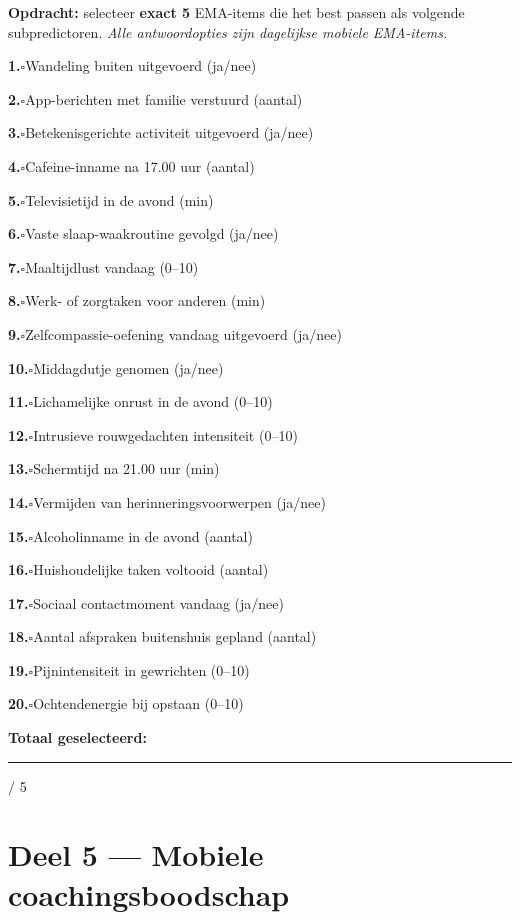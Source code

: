 \documentclass[11pt,a4paper]{article}
\newcommand{\checkitemBFS}[2]{%
\noindent\small\textbf{#1.}\hspace{0.45em}$\square$\hspace{0.4em}#2\par\vspace{0.20em}}
\begin{document}
\begin{responsebox}
\small\textbf{Opdracht:} selecteer \textbf{exact 5} EMA-items die het best passen als volgende subpredictoren.
\textit{Alle antwoordopties zijn dagelijkse mobiele EMA-items.}

\checkitemBFS{1}{Wandeling buiten uitgevoerd (ja/nee)}
\checkitemBFS{2}{App-berichten met familie verstuurd (aantal)}
\checkitemBFS{3}{Betekenisgerichte activiteit uitgevoerd (ja/nee)}
\checkitemBFS{4}{Cafeine-inname na 17.00 uur (aantal)}
\checkitemBFS{5}{Televisietijd in de avond (min)}
\checkitemBFS{6}{Vaste slaap-waakroutine gevolgd (ja/nee)}
\checkitemBFS{7}{Maaltijdlust vandaag (0--10)}
\checkitemBFS{8}{Werk- of zorgtaken voor anderen (min)}
\checkitemBFS{9}{Zelfcompassie-oefening vandaag uitgevoerd (ja/nee)}
\checkitemBFS{10}{Middagdutje genomen (ja/nee)}
\checkitemBFS{11}{Lichamelijke onrust in de avond (0--10)}
\checkitemBFS{12}{Intrusieve rouwgedachten intensiteit (0--10)}
\checkitemBFS{13}{Schermtijd na 21.00 uur (min)}
\checkitemBFS{14}{Vermijden van herinneringsvoorwerpen (ja/nee)}
\checkitemBFS{15}{Alcoholinname in de avond (aantal)}
\checkitemBFS{16}{Huishoudelijke taken voltooid (aantal)}
\checkitemBFS{17}{Sociaal contactmoment vandaag (ja/nee)}
\checkitemBFS{18}{Aantal afspraken buitenshuis gepland (aantal)}
\checkitemBFS{19}{Pijnintensiteit in gewrichten (0--10)}
\checkitemBFS{20}{Ochtendenergie bij opstaan (0--10)}
\vspace{0.4em}
\noindent\textbf{Totaal geselecteerd:}\hspace{0.5em}\rule{1.2cm}{0.25pt}\hspace{0.2em}/ 5
\end{responsebox}

\vspace{0.6em}
\newpage


\section{Deel 5 --- Mobiele coachingsboodschap}
\end{document}
